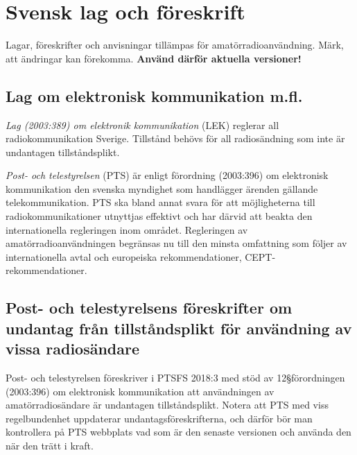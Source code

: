 \section{Svensk lag och föreskrift}
\label{svensk lag och föreskrift}

Lagar, föreskrifter och anvisningar tillämpas för
  amatörradioanvändning.
Märk, att ändringar kan förekomma.
\textbf{Använd därför aktuella versioner!}


\subsection{Lag om elektronisk kommunikation m.fl.}

\emph{Lag (2003:389) om elektronik kommunikation} (LEK) \cite{SFS2003:389}
reglerar all radiokommunikation Sverige.
Tillstånd behövs för all radiosändning som inte är undantagen tillståndsplikt.

\emph{Post- och telestyrelsen} (PTS) är enligt förordning (2003:396) om
elektronisk kommunikation den svenska myndighet som handlägger ärenden gällande
telekommunikation.
PTS ska bland annat svara för att möjligheterna till radiokommunikationer
utnyttjas effektivt och har därvid att beakta den internationella regleringen
inom området.
Regleringen av amatörradioanvändningen begränsas nu till den minsta omfattning
som följer av internationella avtal och europeiska rekommendationer,
CEPT-rekommendationer.

\subsection{Post- och telestyrelsens föreskrifter om undantag från tillståndsplikt för användning av vissa radiosändare}
\label{PTSFS2018:3}

Post- och telestyrelsen föreskriver i PTSFS 2018:3 \cite{PTSFS2018:3} med stöd
av 12\S förordningen (2003:396) \cite{SFS2003:396} om elektronisk kommunikation
att användningen av amatörradiosändare är undantagen tillståndsplikt.
Notera att PTS med viss regelbundenhet uppdaterar undantagsföreskrifterna,
och därför bör man kontrollera på PTS webbplats vad som är den senaste versionen
och använda den när den trätt i kraft.

